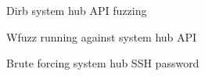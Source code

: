\documentclass{article}
\begin{document}
\begin{figure}[!htb]
	\caption{Dirb system hub API fuzzing}
\end{figure}

\begin{figure}[!htb]
	\caption{Wfuzz running against system hub API}
\end{figure}

\begin{figure}[!htb]
\caption{Brute forcing system hub SSH password}
\end{figure}
\end{document}
